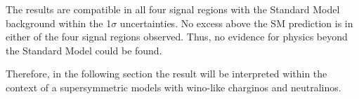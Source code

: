 The results are compatible in all four signal regions with the Standard Model background within the 1$\sigma$ uncertainties.
No excess above the SM prediction is in either of the four signal regions observed.
Thus, no evidence for physics beyond the Standard Model could be found.

Therefore, in the following section the result will be interpreted within the context of a supersymmetric models with wino-like charginos and neutralinos.






